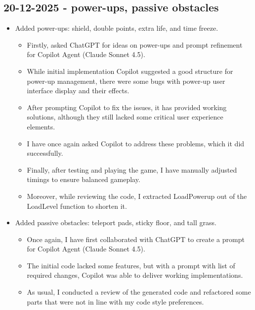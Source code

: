 \documentclass[11pt,a4paper]{article}
\begin{document}
\subsection{20-12-2025 - power-ups, passive obstacles}
\begin{itemize}
    \item Added power-ups: shield, double points, extra life, and time freeze.
    \begin{itemize}
        \item Firstly, asked ChatGPT for ideas on power-ups and prompt refinement for Copilot Agent (Claude Sonnet 4.5).
        \item While initial implementation Copilot suggested a good structure for power-up management, there were some bugs with power-up user interface display and their effects.
        \item After prompting Copilot to fix the issues, it has provided working solutions, although they still lacked some critical user experience elements.
        \item I have once again asked Copilot to address these problems, which it did successfully.
        \item Finally, after testing and playing the game, I have manually adjusted timings to ensure balanced gameplay.
        \item Moreover, while reviewing the code, I extracted LoadPowerup out of the LoadLevel function to shorten it.
    \end{itemize}
    
    \item Added passive obstacles: teleport pads, sticky floor, and tall grass.
    \begin{itemize}
        \item Once again, I have first collaborated with ChatGPT to create a prompt for Copilot Agent (Claude Sonnet 4.5).
        \item The initial code lacked some features, but with a prompt with list of required changes, Copilot was able to deliver working implementations.
        \item As usual, I conducted a review of the generated code and refactored some parts that were not in line with my code style preferences.
    \end{itemize}
\end{itemize}
\end{document}
